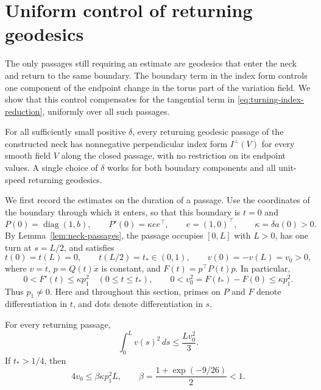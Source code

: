 \section{Uniform control of returning geodesics}
\label{sec:turning}

The only passages still requiring an estimate are geodesics that enter the
neck and return to the same boundary.  The boundary term in the index form
controls one component of the endpoint change in the torus part of the
variation field.  We show
that this control compensates for the tangential term in
\eqref{eq:turning-index-reduction}, uniformly over all such passages.

\begin{proposition}\label{prop:turning-index}
For all sufficiently small positive $\delta$, every returning geodesic
passage of the constructed neck has nonnegative perpendicular index form
$I^\perp(V)$ for every smooth field $V$ along the closed passage, with no
restriction on its endpoint values.  A single choice of $\delta$ works for
both boundary components and all unit-speed returning geodesics.
\end{proposition}

We first record the estimates on the duration of a passage.  Use the
coordinates of the boundary through which it enters, so that this boundary
is $t=0$ and
\[
 P(0)=\operatorname{diag}(1,b),\qquad
 P'(0)=\kappa ee^\top,\qquad
 e=(1,0)^\top,\qquad \kappa=\delta a(0)>0.
\]
By Lemma~\ref{lem:neck-passages}, the passage occupies $[0,L]$ with
$L>0$, has one turn at $s=L/2$, and satisfies
\[
 t(0)=t(L)=0,\qquad t(L/2)=t_*\in(0,1),\qquad
 v(0)=-v(L)=v_0>0,
\]
where $v=\dot t$, $p=Q(t)\dot x$ is constant, and
$F(t)=p^\top P(t)p$.  In particular,
\begin{equation}\label{eq:turning-basic}
 0<F'(t)\le\kappa p_1^2\quad(0\le t\le t_*),\qquad
 0<v_0^2=F(t_*)-F(0)\le\kappa p_1^2.
\end{equation}
Thus $p_1\ne0$.  Here and throughout this section, primes on $P$ and $F$
denote differentiation in $t$, and dots denote differentiation in $s$.

\begin{lemma}\label{lem:turning-time}
For every returning passage,
\begin{equation}\label{eq:turning-chord}
 \int_0^L v(s)^2\,ds\le \frac{Lv_0^2}{3}.
\end{equation}
If $t_*>1/4$, then
\begin{equation}\label{eq:turning-time-margin}
 4v_0\le\beta\kappa p_1^2L,
 \qquad \beta=\frac{1+\exp(-9/26)}{2}<1.
\end{equation}
\end{lemma}

